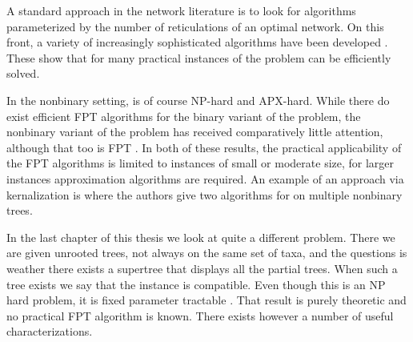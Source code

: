 A standard approach in the network literature is to look for algorithms parameterized by the number of reticulations of an optimal network. On this front, a variety of increasingly sophisticated algorithms have been developed \cite{bordewich2,bordewich07b,hybridnet,quantifyingreticulation,firststeps,whiddenFixed,whiddenWABI}. These show that for many practical instances of \mh the problem can be efficiently solved.


In the nonbinary setting, \mh is of course NP-hard and APX-hard. While there do exist efficient FPT algorithms for the binary variant of the problem, the nonbinary variant of the problem has received comparatively little attention, although that too is FPT \cite{linzsemple2009,teresaFPT}. In both of these results, the practical applicability of the FPT algorithms is limited to instances of small or moderate size, for larger instances approximation algorithms are required. An example of an approach via kernalization is \cite{IerselKelk2014} where the authors give two algorithms for \mh on multiple nonbinary trees. 





 

% 
% 
% 




In the last chapter of this thesis we look at quite a different problem. There we are given unrooted trees, not always on the same set of taxa, and the questions is weather there exists a supertree that displays all the partial trees. When such a tree exists we say that the instance is compatible. Even though this is an NP hard problem, it is fixed parameter tractable \cite{BryLag06}. That result is purely theoretic and no practical FPT algorithm is known. There exists however a number of useful characterizations. 

